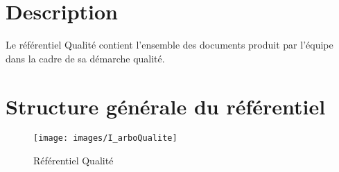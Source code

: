 \section{Description}

Le référentiel Qualité contient l'ensemble des documents produit par l'équipe \nomEquipe{}
dans la cadre de sa démarche qualité.

\section{Structure générale du référentiel}\label{ref_qualite}



\begin{figure}[ht]
         \begin{center}
         \texttt{[image: images/I\_arboQualite]}
         \end{center}
         \caption{Référentiel Qualité}
 \end{figure}
 
\clearpage



